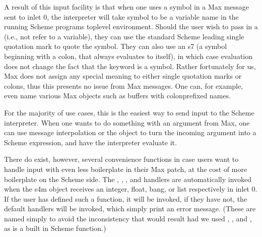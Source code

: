 \documentclass[letterpaper,10pt,english]{sphinxmanual}
\begin{document}
\sphinxAtStartPar
A result of this input facility is that when one uses a symbol in a Max message sent to inlet 0, the interpreter will take symbol
to be a variable name in the running Scheme programs top\sphinxhyphen{}level environment.
Should the user wish to pass in a  (i.e., not refer to a variable), they can use the standard Scheme leading single
quotation mark to quote the symbol.
They can also use an s7  (a symbol beginning with a colon, that always evaluates to itself), in which case evaluation
does not change the fact that the keyword is a symbol.
Rather fortunately for us, Max does not assign any special meaning to either single quotation marks or colons, thus this
presents no issue from Max messages.  One can, for example, even name various Max objects such as buffers with colon\sphinxhyphen{}prefixed names.

\sphinxAtStartPar
For the majority of use cases, this is the easiest way to send input to the Scheme interpreter.
When one wants to do something with an argument from Max, one can use message interpolation or the  object
to turn the incoming argument into a Scheme expression, and have the interpreter evaluate it.

\sphinxAtStartPar
There do exist, however, several convenience functions in case users want to handle input with even less boilerplate in their Max patch,
at the cost of more boilerplate on the Scheme side.
The , , , and  handlers are automatically invoked when the s4m object receives an
integer, float, bang, or list respectively in inlet 0.
If the user has defined such a function, it will be invoked, if they have not, the default handlers will be invoked, which
simply print an error message.
(These are named  simply to avoid the inconsistency that would result had we used , , and ,
as  is a built in Scheme function.)
\end{document}
